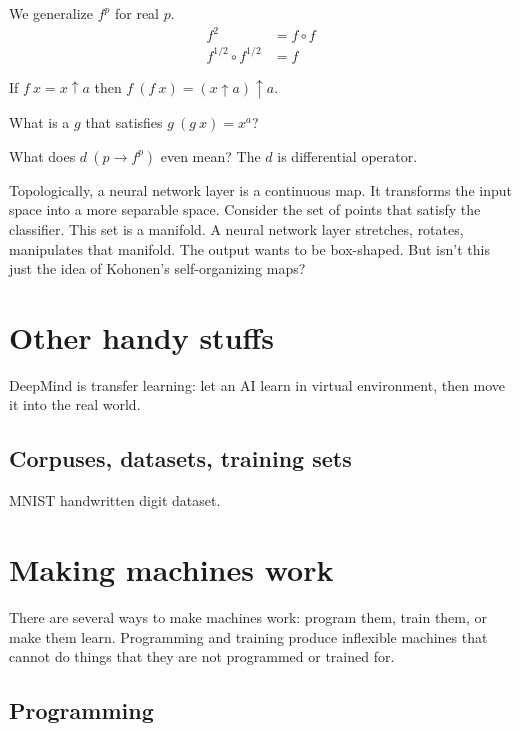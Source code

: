 We generalize \(f^p\) for real \(p\).
\begin{align*}
    f^2 &= f \circ f
    \\
    f^{1/2} \circ f^{1/2} &= f
\end{align*}

If \(f~x = x \uparrow a\) then \(f~(f~x) = (x \uparrow a) \uparrow a\).

What is a \(g\) that satisfies \(g~(g~x) = x^a\)?

What does \(d~(p \to f^p)\) even mean?
The \(d\) is differential operator.



Topologically, a neural network layer is a continuous map.
It transforms the input space into a more separable space.
Consider the set of points that satisfy the classifier.
This set is a manifold.
A neural network layer stretches, rotates, manipulates that manifold.
The output wants to be box-shaped.
But isn't this just the idea of Kohonen's self-organizing maps?

\chapter{Other handy stuffs}

DeepMind is transfer learning:
let an AI learn in virtual environment,
then move it into the real world.

\section{Corpuses, datasets, training sets}

MNIST handwritten digit dataset.


\chapter{Making machines work}

There are several ways to make machines work:
program them, train them, or make them learn.
Programming and training produce inflexible machines
that cannot do things that they are not programmed or trained for.

\section{Programming}

